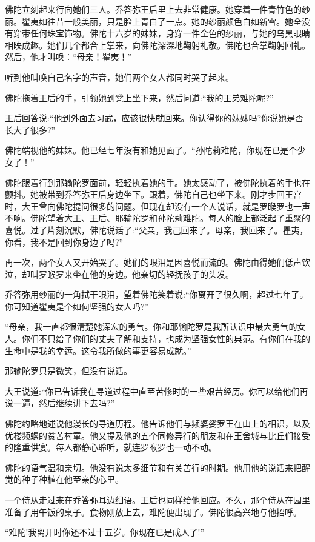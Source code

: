\documentclass[12pt,twoside,openany]{book}
\begin{document}
佛陀立刻起来行向她们三人。乔答弥王后里上去非常健康。她穿着一件青竹色的纱丽。瞿夷如往昔一般美丽，只是脸上青白了一点。她的纱丽颜色白如新雪。她全没有穿带任何珠宝饰物。佛陀十六岁的妹妹，身穿一件全色的纱丽，与她的乌黑眼睛相映成趣。她们几个都合上掌来，向佛陀深深地鞠躬礼敬。佛陀也合掌鞠躬回礼。然后，他才叫唤：“母亲！瞿夷！”

听到他叫唤自己名字的声音，她们两个女人都同时哭了起来。

佛陀拖着王后的手，引领她到凳上坐下来，然后问道:“我的王弟难陀呢?”

王后回答说:“他到外面去习武，应该很快就回来。你认得你的妹妹吗?你说她是否长大了很多?”

佛陀端视他的妹妹。他已经七年没有和她见面了。“孙陀莉难陀，你现在已是个少女了！”

佛陀跟着行到那输陀罗面前，轻轻执着她的手。她太感动了，被佛陀执着的手也在颤抖。她被带到乔答弥王后身边坐下。跟着，佛陀自己也坐下来。刚才步回王宫时，大王曾向佛陀提问很多的问题。但现在却没有一个人说话，就是罗睺罗也一声不响。佛陀望着大王、王后、耶输陀罗和孙陀莉难陀。每人的脸上都泛起了重聚的喜悦。过了片刻沉默，佛陀说话了:“父亲，我己回来了。母亲，我回来了。瞿夷，你看，我不是回到你身边了吗?”

再一次，两个女人又开始哭了。她们的眼泪是因喜悦而流的。佛陀由得她们低声饮泣，却叫罗睺罗来坐在他的身边。他亲切的轻抚孩子的头发。

乔答弥用纱丽的一角拭干眼泪，望着佛陀笑着说:“你离开了很久啊，超过七年了。你可知道瞿夷是个如何坚强的女人吗?”

“母亲，我一直都很清楚她深宏的勇气。你和耶输陀罗是我所认识中最大勇气的女人。你们不只给了你们的丈夫了解和支持，也成为坚强女性的典范。有你们在我的生命中是我的幸运。这令我所做的事更容易成就。”

那输陀罗只是微笑，但没有说话。

大王说道:“你已告诉我在寻道过程中直至苦修时的一些艰苦经历。你可以给他们再说一遍，然后继续讲下去吗?”

佛陀约略地述说他漫长的寻道历程。他告诉他们与频婆娑罗王在山上的相识，以及优楼频螺的贫苦村童。他又提及他的五个同修异行的朋友和在王舍城与比丘们接受的隆重供宴。每人都静心聆听，就连罗睺罗也一动不动。

佛陀的语气温和亲切。他没有说太多细节和有关苦行的时期。他用他的说话来把醒觉的种子种植在他至亲的心里。

一个侍从走过来在乔答弥耳边细语。王后也同样给他回应。不久，那个侍从在园里准备了用午饭的桌子。食物刚放上去，难陀便出现了。佛陀很高兴地与他招呼。

“难陀!我离开时你还不过十五岁。你现在已是成人了!”
\end{document}
